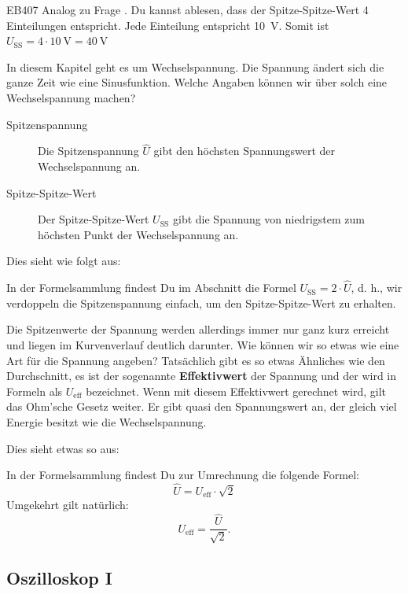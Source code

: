 \begin{sol}{EB407}
    Analog zu Frage .
 Du kannst ablesen, dass der Spitze-Spitze-Wert 4 Einteilungen entspricht. Jede Einteilung entspricht \SI{10}{\volt}.
 Somit ist $U_\text{SS} = 4 \cdot \SI{10}{\volt} = \SI{40}{\volt}$
\end{sol}

\begin{ohmchapter}
    In diesem Kapitel geht es um Wechselspannung. Die Spannung ändert sich die ganze Zeit wie eine Sinusfunktion.
    Welche Angaben können wir über solch eine Wechselspannung machen?

    \begin{description}
        \item[Spitzenspannung] Die Spitzenspannung $\hat{U}$ gibt den höchsten Spannungswert der Wechselspannung an.
        \item[Spitze-Spitze-Wert] Der Spitze-Spitze-Wert $U_\text{SS}$ gibt die Spannung von niedrigstem zum höchsten Punkt der Wechselspannung an.        
    \end{description}
    
    Dies sieht wie folgt aus:

    In der Formelsammlung findest Du im Abschnitt  die Formel $U_\text{SS} = 2 \cdot \hat{U}$, d. h., wir verdoppeln die Spitzenspannung einfach, um den Spitze-Spitze-Wert zu erhalten.

    Die Spitzenwerte der Spannung werden allerdings immer nur ganz kurz erreicht und liegen im Kurvenverlauf deutlich darunter. Wie können wir so etwas wie eine Art  für die Spannung angeben? 
    Tatsächlich gibt es so etwas Ähnliches wie den Durchschnitt, es ist der sogenannte \textbf{Effektivwert} der Spannung und der wird in Formeln als $U_\text{eff}$ bezeichnet. Wenn mit diesem Effektivwert gerechnet wird, gilt das Ohm’sche Gesetz weiter. Er gibt quasi den Spannungswert an, der gleich viel Energie besitzt wie die Wechselspannung.

    Dies sieht etwas so aus:

    In der Formelsammlung findest Du zur Umrechnung die folgende Formel:
    $$\hat{U} = U_\text{eff} \cdot \sqrt{2}$$
    Umgekehrt gilt natürlich: 
    $$U_\text{eff} = \frac{\hat{U}}{\sqrt{2}}. $$

\end{ohmchapter}   

\subsection{Oszilloskop I}

